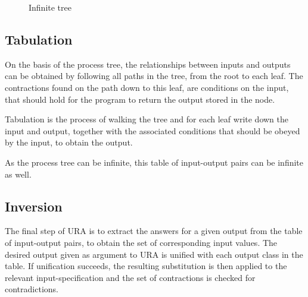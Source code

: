 \documentclass[10pt]{../sigplanconf}
\begin{document}
\begin{figure}
  \centering

  \caption{Infinite tree}
  \label{fig:inftree}
\end{figure}

\subsection{Tabulation}
On the basis of the process tree, the relationships between inputs and
outputs can be obtained by following all paths in the tree, from the
root to each leaf. The contractions found on the path down to this
leaf, are conditions on the input, that should hold for the program to
return the output stored in the node.

Tabulation is the process of walking the tree and for each leaf write
down the input and output, together with the associated conditions
that should be obeyed by the input, to obtain the output.

As the process tree can be infinite, this table of input-output pairs
can be infinite as well.

\subsection{Inversion}
The final step of URA is to extract the answers for a given output
from the table of input-output pairs, to obtain the set of
corresponding input values. The desired output given as argument to
URA is unified with each output class in the table. If unification
succeeds, the resulting substitution is then applied to the relevant
input-specification and the set of contractions is checked for
contradictions.
\end{document}
